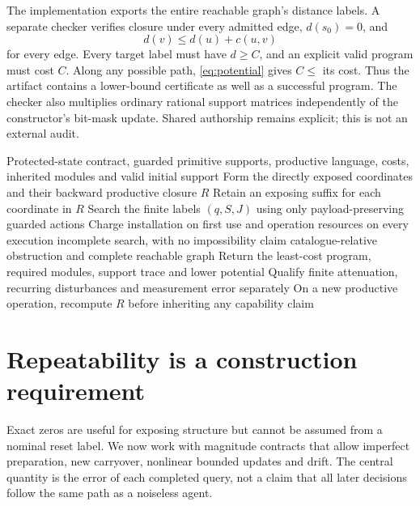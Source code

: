 \documentclass[11pt,letterpaper]{article}
\theoremstyle{definition}\newtheorem{definition}[theorem]{Definition}
\theoremstyle{remark}\newtheorem{remark}[theorem]{Remark}
\begin{document}
The implementation exports the entire reachable graph's distance labels. A separate checker verifies closure under every admitted edge, $d(s_0)=0$, and
\begin{equation}
 d(v)\leq d(u)+c(u,v)
 \label{eq:potential}
\end{equation}
for every edge. Every target label must have $d\geq C$, and an explicit valid program must cost $C$. Along any possible path, \eqref{eq:potential} gives $C\leq$ its cost. Thus the artifact contains a lower-bound certificate as well as a successful program. The checker also multiplies ordinary rational support matrices independently of the constructor's bit-mask update. Shared authorship remains explicit; this is not an external audit.

\begin{algorithm}[htbp]
\caption{Construct a purpose-closed capability}
\begin{algorithmic}[1]
\Require Protected-state contract, guarded primitive supports, productive language, costs, inherited modules and valid initial support
\State Form the directly exposed coordinates and their backward productive closure $R$
\State Retain an exposing suffix for each coordinate in $R$
\State Search the finite labels $(q,S,J)$ using only payload-preserving guarded actions
\State Charge installation on first use and operation resources on every execution
 \State \Return incomplete search, with no impossibility claim
\EndIf
{}
 \State \Return catalogue-relative obstruction and complete reachable graph
\EndIf
\State Return the least-cost program, required modules, support trace and lower potential
\State Qualify finite attenuation, recurring disturbances and measurement error separately
\State On a new productive operation, recompute $R$ before inheriting any capability claim
\end{algorithmic}
\end{algorithm}

\section{Repeatability is a construction requirement}
\label{sec:repeat}
Exact zeros are useful for exposing structure but cannot be assumed from a nominal reset label. We now work with magnitude contracts that allow imperfect preparation, new carryover, nonlinear bounded updates and drift. The central quantity is the error of each completed query, not a claim that all later decisions follow the same path as a noiseless agent.
\end{document}
